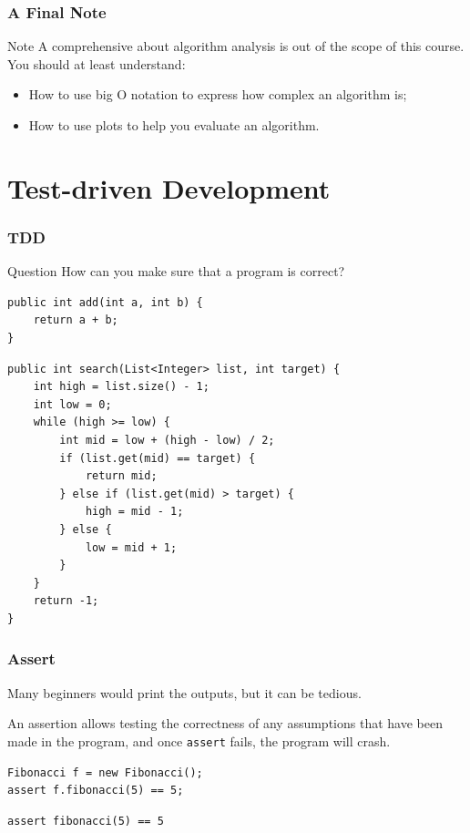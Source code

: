 \documentclass[aspectratio=169, 14pt]{beamer}
\begin{document}
\begin{frame}
    \frametitle{A Final Note}
\begin{alertblock}{Note}
    A comprehensive about algorithm analysis is out of the scope of this course. You should at least understand:
    
    \begin{itemize}
        \item How to use big O notation to express how complex an algorithm is;
        \item How to use plots to help you evaluate an algorithm.
    \end{itemize}
\end{alertblock}
\end{frame}

\section{Test-driven Development}
\begin{frame}[fragile]
    \frametitle{TDD}
    \begin{exampleblock}{Question}
    How can you make sure that a program is correct?
    \end{exampleblock}
    \begin{verbatim}
public int add(int a, int b) {
    return a + b;
} 
    \end{verbatim} 
\end{frame}

\begin{frame}[fragile]
    \begin{verbatim}
public int search(List<Integer> list, int target) {
    int high = list.size() - 1;
    int low = 0;
    while (high >= low) {
        int mid = low + (high - low) / 2;
        if (list.get(mid) == target) {
            return mid;
        } else if (list.get(mid) > target) {
            high = mid - 1;
        } else {
            low = mid + 1;
        }
    }
    return -1;
}
    \end{verbatim} 
\end{frame}

\begin{frame}[fragile]
    \frametitle{Assert}
    Many beginners would print the outputs, but it can be tedious.

\pause
An \alert{assertion} allows testing the correctness of any assumptions that have been made in the program, and once \texttt{assert} fails, the program will crash. 

\begin{verbatim}
Fibonacci f = new Fibonacci();
assert f.fibonacci(5) == 5;
\end{verbatim}

\begin{verbatim}
assert fibonacci(5) == 5
\end{verbatim}

\end{frame}
\end{document}
